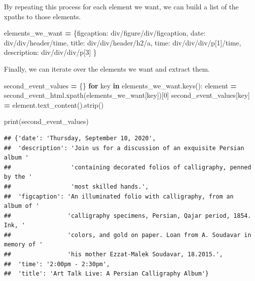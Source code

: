 \documentclass[
]{book}
\newenvironment{Shaded}{\begin{snugshade}}{\end{snugshade}}
\newcommand{\BuiltInTok}[1]{#1}
\newcommand{\ControlFlowTok}[1]{\textcolor[rgb]{0.13,0.29,0.53}{\textbf{#1}}}
\newcommand{\DecValTok}[1]{\textcolor[rgb]{0.00,0.00,0.81}{#1}}
\newcommand{\KeywordTok}[1]{\textcolor[rgb]{0.13,0.29,0.53}{\textbf{#1}}}
\newcommand{\NormalTok}[1]{#1}
\newcommand{\OperatorTok}[1]{\textcolor[rgb]{0.81,0.36,0.00}{\textbf{#1}}}
\newcommand{\StringTok}[1]{\textcolor[rgb]{0.31,0.60,0.02}{#1}}
\begin{document}
By repeating this process for each element we want, we can build a list of the xpaths to those elements.

\begin{Shaded}
\begin{Highlighting}[]
\NormalTok{elements\_we\_want }\OperatorTok{=}\NormalTok{ \{}\StringTok{\textquotesingle{}figcaption\textquotesingle{}}\NormalTok{: }\StringTok{\textquotesingle{}div/figure/div/figcaption\textquotesingle{}}\NormalTok{,}
                    \StringTok{\textquotesingle{}date\textquotesingle{}}\NormalTok{: }\StringTok{\textquotesingle{}div/div/header/time\textquotesingle{}}\NormalTok{,}
                    \StringTok{\textquotesingle{}title\textquotesingle{}}\NormalTok{: }\StringTok{\textquotesingle{}div/div/header/h2/a\textquotesingle{}}\NormalTok{,}
                    \StringTok{\textquotesingle{}time\textquotesingle{}}\NormalTok{: }\StringTok{\textquotesingle{}div/div/div/p[1]/time\textquotesingle{}}\NormalTok{,}
                    \StringTok{\textquotesingle{}description\textquotesingle{}}\NormalTok{: }\StringTok{\textquotesingle{}div/div/div/p[3]\textquotesingle{}}
\NormalTok{                    \}}
\end{Highlighting}
\end{Shaded}

Finally, we can iterate over the elements we want and extract them.

\begin{Shaded}
\begin{Highlighting}[]
\NormalTok{second\_event\_values }\OperatorTok{=}\NormalTok{ \{\}}
\ControlFlowTok{for}\NormalTok{ key }\KeywordTok{in}\NormalTok{ elements\_we\_want.keys():}
\NormalTok{    element }\OperatorTok{=}\NormalTok{ second\_event\_html.xpath(elements\_we\_want[key])[}\DecValTok{0}\NormalTok{]}
\NormalTok{    second\_event\_values[key] }\OperatorTok{=}\NormalTok{ element.text\_content().strip()}

\BuiltInTok{print}\NormalTok{(second\_event\_values)}
\end{Highlighting}
\end{Shaded}

\begin{verbatim}
## {'date': 'Thursday, September 10, 2020',
##  'description': 'Join us for a discussion of an exquisite Persian album '
##                 'containing decorated folios of calligraphy, penned by the '
##                 'most skilled hands.',
##  'figcaption': 'An illuminated folio with calligraphy, from an album of '
##                'calligraphy specimens, Persian, Qajar period, 1854. Ink, '
##                'colors, and gold on paper. Loan from A. Soudavar in memory of '
##                'his mother Ezzat-Malek Soudavar, 18.2015.',
##  'time': '2:00pm - 2:30pm',
##  'title': 'Art Talk Live: A Persian Calligraphy Album'}
\end{verbatim}
\end{document}
